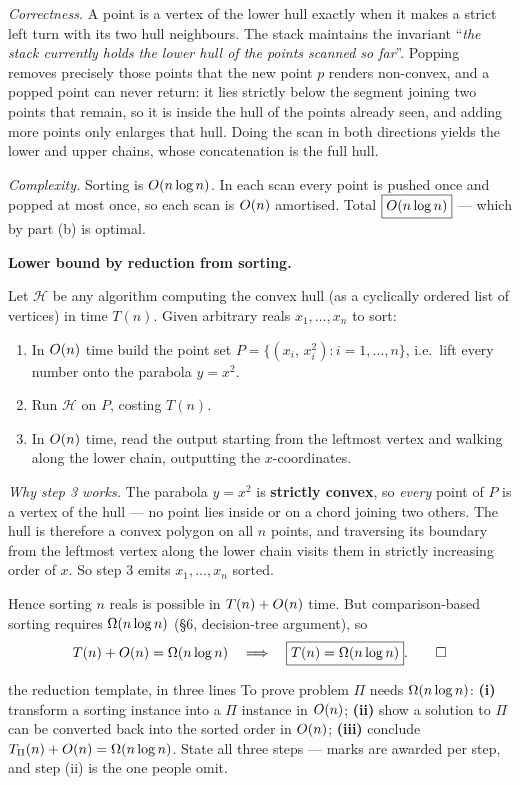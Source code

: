 \emph{Correctness.} A point is a vertex of the lower hull exactly when it makes a strict left turn
with its two hull neighbours. The stack maintains the invariant ``\emph{the stack currently holds
the lower hull of the points scanned so far}''. Popping removes precisely those points that the
new point $p$ renders non-convex, and a popped point can never return: it lies strictly below the
segment joining two points that remain, so it is inside the hull of the points already seen, and
adding more points only enlarges that hull. Doing the scan in both directions yields the lower and
upper chains, whose concatenation is the full hull.

\emph{Complexity.} Sorting is $O(n\log n)$. In each scan every point is pushed once and popped
at most once, so each scan is $O(n)$ amortised. Total $\boxed{O(n\log n)}$ --- which by part
(b) is optimal.

 \textbf{Lower bound by reduction from sorting.}

Let $\mathcal H$ be any algorithm computing the convex hull (as a cyclically ordered list of
vertices) in time $T(n)$. Given arbitrary reals $x_1,\dots,x_n$ to sort:
\begin{enumerate}
  \item In $O(n)$ time build the point set $P=\{(x_i,\,x_i^2):i=1,\dots,n\}$, i.e.\ lift every
        number onto the parabola $y=x^2$.
  \item Run $\mathcal H$ on $P$, costing $T(n)$.
  \item In $O(n)$ time, read the output starting from the leftmost vertex and walking along the
        lower chain, outputting the $x$-coordinates.
\end{enumerate}
\emph{Why step 3 works.} The parabola $y=x^2$ is \textbf{strictly convex}, so \emph{every} point
of $P$ is a vertex of the hull --- no point lies inside or on a chord joining two others. The hull
is therefore a convex polygon on all $n$ points, and traversing its boundary from the leftmost
vertex along the lower chain visits them in strictly increasing order of $x$. So step 3 emits
$x_1,\dots,x_n$ sorted.

Hence sorting $n$ reals is possible in $T(n)+O(n)$ time. But comparison-based sorting requires
$\Omega(n\log n)$ (\S6, decision-tree argument), so
\[
  T(n)+O(n)=\Omega(n\log n)\quad\Longrightarrow\quad \boxed{T(n)=\Omega(n\log n)} . \qquad\square
\]

\begin{facts}{the reduction template, in three lines}
To prove problem $\Pi$ needs $\Omega(n\log n)$: \textbf{(i)} transform a sorting instance into a
$\Pi$ instance in $O(n)$; \textbf{(ii)} show a solution to $\Pi$ can be converted back into the
sorted order in $O(n)$; \textbf{(iii)} conclude $T_\Pi(n)+O(n)=\Omega(n\log n)$. State all three
steps --- marks are awarded per step, and step (ii) is the one people omit.
\end{facts}

